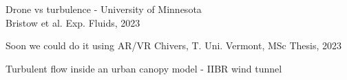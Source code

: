     \begin{frame}[label=app-8]{Drone vs turbulence - University of Minnesota}
    \\
    Bristow et al. Exp. Fluids, 2023
    \end{frame}
    
    \begin{frame}[label=app-9]{Soon we could do it using AR/VR}
    Chivers, T. Uni. Vermont, MSc Thesis, 2023
    \end{frame}
    
    
    \begin{frame}[label=app-811]{Turbulent flow inside an urban canopy model - IIBR wind tunnel}
    \end{frame}
%    

%